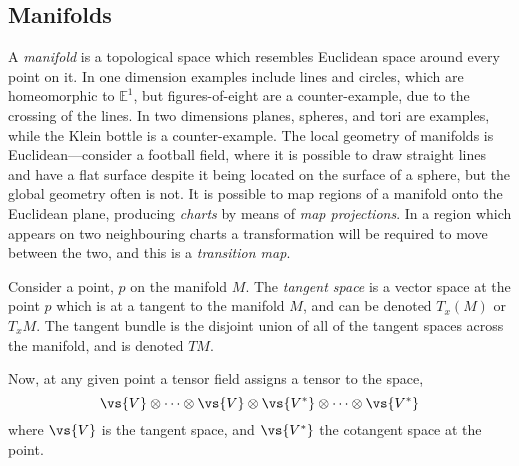 \subsection{Manifolds}
\label{sec:manifolds}

A \emph{manifold} is a topological space which resembles Euclidean
space around every point on it. In one dimension examples include
lines and circles, which are homeomorphic to $\mathbb{E}^1$, but
figures-of-eight are a counter-example, due to the crossing of the
lines. In two dimensions planes, spheres, and tori are examples, while
the Klein bottle is a counter-example. The local geometry of manifolds
is Euclidean---consider a football field, where it is possible to draw
straight lines and have a flat surface despite it being located on the
surface of a sphere, but the global geometry often is not. It is
possible to map regions of a manifold onto the Euclidean plane,
producing \emph{charts} by means of \emph{map projections}. In a
region which appears on two neighbouring charts a transformation will
be required to move between the two, and this is a \emph{transition
  map}.

Consider a point, $p$ on the manifold $M$. The \emph{tangent space} is
a vector space at the point $p$ which is at a tangent to the manifold
$M$, and can be denoted $T_{x}(M)$ or $T_xM$. The tangent bundle is
the disjoint union of all of the tangent spaces across the manifold,
and is denoted $TM$.

Now, at any given point a tensor field assigns a tensor to the space,
\[ \vs{V} \otimes \cdots \otimes \vs{V} \otimes \vs{V^{*}} \otimes
\cdots \otimes \vs{V^{*}}\] where $\vs{V}$ is the tangent space, and
$\vs{V^{*}}$ the cotangent space at the point.


